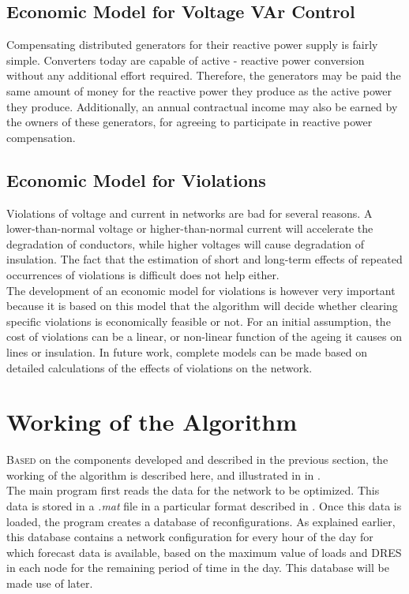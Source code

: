 \subsection{Economic Model for Voltage VAr Control}
Compensating distributed generators for their reactive power supply is fairly simple. Converters today are capable of active - reactive power conversion without any additional effort required. Therefore, the generators may be paid the same amount of money for the reactive power they produce as the active power they produce. Additionally, an annual contractual income may also be earned by the owners of these generators, for agreeing to participate in reactive power compensation.

\subsection{Economic Model for Violations}
Violations of voltage and current in networks are bad for several reasons. A lower-than-normal voltage or higher-than-normal current will accelerate the degradation of conductors, while higher voltages will cause degradation of insulation. The fact that the estimation of short and long-term effects of repeated occurrences of violations is difficult does not help either.\\

The development of an economic model for violations is however very important because it is based on this model that the algorithm will decide whether clearing specific violations is economically feasible or not. For an initial assumption, the cost of violations can be a linear, or non-linear function of the ageing it causes on lines or insulation. In future work, complete models can be made based on detailed calculations of the effects of violations on the network.

\section{Working of the Algorithm}
\lettrine[nindent=0pt]{B}{ased} on the components developed and described in the previous section, the working of the algorithm is described here, and illustrated in  in .\\

The main program first reads the data for the network to be optimized. This data is stored in a \emph{.mat} file in a particular format described in . Once this data is loaded, the program creates a database of reconfigurations. As explained earlier, this database contains a network configuration for every hour of the day for which forecast data is available, based on the maximum value of loads and DRES in each node for the remaining period of time in the day. This database will be made use of later.\\

